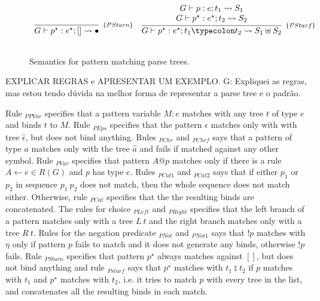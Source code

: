 \begin{figure}[H]
\[\begin{array}{cc}
      \infer[_{\{PStarn\}}]{G \vdash p^\star : e^\star ; [] \leadsto \bullet}{} &
      \infer[_{\{PStarf\}}]{G\vdash p^\star : e^\star ; t_1  \typecolon  t_2 \leadsto S_1 \uplus S_2}
                        {\begin{array}{c}
                           G \vdash p : e ; t_1 \leadsto S_1\\
                           G \vdash p^\star : e^\star ; t_2 \leadsto S_2
                         \end{array}}\\ \\
    \end{array}
  \]
  \centering
  \caption{Semantics for pattern matching parse trees.}
  \label{fig:pattern-semantics}
\end{figure}

EXPLICAR REGRAS e APRESENTAR UM EXEMPLO.
G: Expliquei as regras, mas estou tendo dúvida na melhor forma de representar a 
parse tree e o padrão.

Rule \(_{PPVar}\) specifies that a pattern variable \(M : e\) matches with any
tree \(t\) of type \(e\) and binds \(t\) to \(M\). Rule \(_{PEps}\) specifies 
that the pattern \(\epsilon\) matches only with with tree \(\hat{\epsilon}\),
but does not bind anything. Rules \(_{PChr}\) and \(_{PChrf}\) says that 
a pattern of type \(a\) matches only with the tree \(\hat{a}\) and fails if 
matched against any other symbol. Rule \(_{PVar}\) specifies that pattern \(A@p\)
matches only if there is a rule \(A \leftarrow e \in R(G)\) and \(p\) has type \(e\).
Rules \(_{PCat1}\) and \(_{PCat2}\) says that if either \(p_1\) or \(p_2\) in
sequence \(p_1\:p_2\) does not match, then the whole sequence does not match either.
Otherwise, rule \(_{PCat}\) specifies that the the resulting binds are concatenated.
The rules for choice \(_{PLeft}\) and \(_{PRight}\) specifies that the left branch 
of a pattern matches only with a tree \(L\:t\) and the right branch matches only
with a tree \(R\:t\). Rules for the negation predicate \(_{PNot}\) and \(_{PNot1}\)
says that \(!p\) matches with \(\eta\) only if pattern \(p\) fails to match 
and it does not generate any binds, otherwise \(!p\) fails.
Rule \(_{PStarn}\) specifies that pattern \(p^\star\) always matches against \([]\),
but does not bind anything and rule \(_{Pstarf}\) says that \(p^\star\) matches 
with \(t_1 \typecolon t_2\) if \(p\) matches with \(t_1\) and \(p^\star\) matches 
with \(t_2\), i.e. it tries to match \(p\) with every tree in the list, and 
concatenates all the resulting binds in each match.

